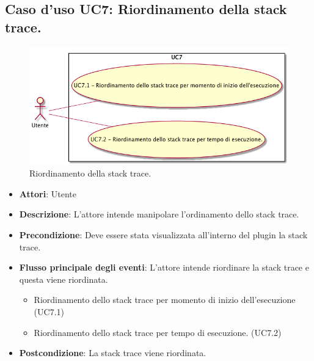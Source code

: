 \subsection{Caso d'uso UC7: Riordinamento della stack trace.}
\begin{figure} [H]
\centering
\includegraphics[scale=0.45]{./UC/UC7.png}
\caption{Riordinamento della stack trace.}\label{}
\end{figure}
\begin{itemize}
\item \textbf{Attori}: Utente
\item \textbf{Descrizione}: L'attore intende manipolare l'ordinamento dello stack trace.

\item \textbf{Precondizione}: Deve essere stata visualizzata all'interno del plugin la stack trace.

\item \textbf{Flusso principale degli eventi}: L'attore intende riordinare la stack trace e questa viene riordinata.
\begin{itemize}
\item Riordinamento dello stack trace per momento di inizio dell'esecuzione (UC7.1)
\item Riordinamento dello stack trace per tempo di esecuzione. (UC7.2)
\end{itemize}
\item \textbf{Postcondizione}: La stack trace viene riordinata. 
\end{itemize}

